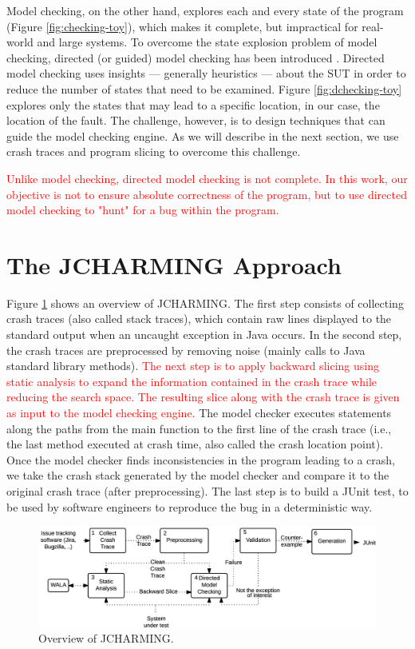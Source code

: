 \documentclass[times, doublespace]{smrauth}
\newcommand{\red}[1]{\textcolor{red}{#1}}
\begin{document}
Model checking, on the other hand, explores each and every state of the program
(Figure \ref{fig:checking-toy}), which makes it complete, but impractical for
real-world and large systems. To overcome the state explosion problem of
model checking, directed (or guided) model checking has been introduced
\cite{Edelkamp2004, Edelkamp2009}. Directed model checking uses insights --- generally
heuristics --- about the SUT in order to reduce the number of states
that need to be examined. Figure \ref{fig:dchecking-toy} explores only
the states that may lead to a specific location, in our case, the
location of the fault. The challenge, however, is to design techniques that
can guide the model checking engine. As we will describe in the next section,
we use crash traces and program slicing to overcome this challenge.

\red{Unlike model checking, directed model checking is not complete. In this work, our objective is not to ensure absolute correctness of the program, but to use directed model checking to "hunt" for a bug within the program.}

\section{The JCHARMING Approach\label{sec:jcharming}}

Figure \ref{fig:jcarming-approach} shows an overview of JCHARMING. The first step
consists of collecting crash traces (also called stack traces), which contain raw lines
displayed to the standard output when an uncaught exception
in Java occurs. In the second step, the crash traces are
preprocessed by removing noise (mainly calls to Java standard
library methods). \red{The next step is to apply backward slicing
using static analysis to expand the information contained in
the crash trace while reducing the search space. The resulting
slice along with the crash trace is given as input to the model
checking engine.} The model checker executes statements
along the paths from the main function to the first line of the
crash trace (i.e., the last method executed at crash time, also
called the crash location point). Once the model checker finds
inconsistencies in the program leading to a crash, we take the
crash stack generated by the model checker and compare it to
the original crash trace (after preprocessing). The last step is
to build a JUnit test, to be used by software engineers to
reproduce the bug in a deterministic way.

\begin{figure}
  \centering
    \includegraphics[scale=0.8]{media/jcharming-approach.png}
    \caption{Overview of JCHARMING.
    \label{fig:jcarming-approach}}
\end{figure}
\end{document}
